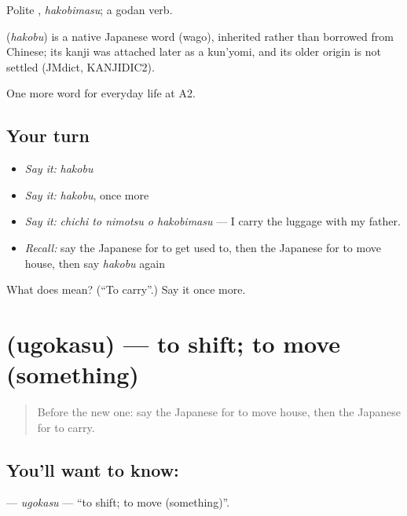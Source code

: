 Polite \textbf{}, \emph{hakobimasu}; a godan verb.

\begin{cousinweb}
\textbf{} (\emph{hakobu}) is a native Japanese word (wago), inherited rather than borrowed from Chinese; its kanji was attached later as a kun'yomi, and its older origin is not settled (JMdict, KANJIDIC2).
\end{cousinweb}

\begin{grammarlens}[title={What you've built}]
One more word for everyday life at A2.
\end{grammarlens}

\subsection*{Your turn}
\begin{itemize}
\raggedright
  \item \emph{Say it:} \emph{hakobu}
  \item \emph{Say it:} \emph{hakobu}, once more
  \item \emph{Say it:} \emph{chichi to nimotsu o hakobimasu} — I carry the luggage with my father.
  \item \emph{Recall:} say the Japanese for to get used to, then the Japanese for to move house, then say \emph{hakobu} again
\end{itemize}

\begin{tcolorbox}[breakable,colback=teal!4,colframe=teal!35!black,title={Before you move on}]
What does  mean? (\textquotedblleft{}To carry\textquotedblright{}.) Say it once more.
\end{tcolorbox}
\section[\texorpdfstring{\ja{うごかす} (ugokasu)}{うごかす (ugokasu)}]{ (ugokasu) — to shift; to move (something)}

\label{lesson:JA-C155-ugokasu}



\begin{quote}
Before the new one: say the Japanese for to move house, then the Japanese for to carry.
\end{quote}

\subsection*{You'll want to know: }
\textbf{} — \emph{ugokasu} — \textquotedblleft{}to shift; to move (something)\textquotedblright{}.

